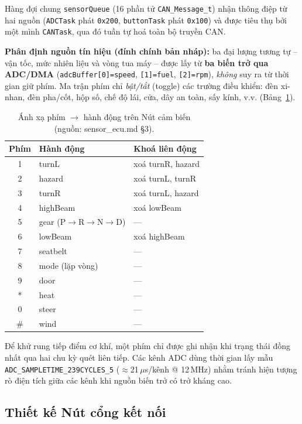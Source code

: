 \documentclass[../DoAn.tex]{subfiles}
\begin{document}
Hàng đợi chung \texttt{sensorQueue} (16 phần tử \texttt{CAN\_Message\_t}) nhận
thông điệp từ hai nguồn (\texttt{ADCTask} phát \texttt{0x200},
\texttt{buttonTask} phát \texttt{0x100}) và được tiêu thụ bởi một mình
\texttt{CANTask}, qua đó tuần tự hoá toàn bộ truyền CAN.

\medskip
\noindent\textbf{Phân định nguồn tín hiệu (đính chính bản nháp):} ba đại lượng
tương tự -- vận tốc, mức nhiên liệu và vòng tua máy -- được lấy từ \textbf{ba
biến trở qua ADC/DMA} (\texttt{adcBuffer[0]=speed}, \texttt{[1]=fuel},
\texttt{[2]=rpm}), \emph{không} suy ra từ thời gian giữ phím. Ma trận phím chỉ
\emph{bật/tắt} (toggle) các trường điều khiển: đèn xi-nhan, đèn pha/cốt, hộp số,
chế độ lái, cửa, dây an toàn, sấy kính, v.v. (Bảng~\ref{tab:keypad}).

\begin{table}[H]
  \centering
  \caption{Ánh xạ phím $\to$ hành động trên Nút cảm biến (nguồn: sensor\_ecu.md §3).}
  \label{tab:keypad}
  \begin{tabular}{@{}cll@{}}
    \toprule
    \textbf{Phím} & \textbf{Hành động} & \textbf{Khoá liên động} \\
    \midrule
    1 & turnL & xoá turnR, hazard \\
    2 & hazard & xoá turnL, turnR \\
    3 & turnR & xoá turnL, hazard \\
    4 & highBeam & xoá lowBeam \\
    5 & gear (P$\to$R$\to$N$\to$D) & --- \\
    6 & lowBeam & xoá highBeam \\
    7 & seatbelt & --- \\
    8 & mode (lặp vòng) & --- \\
    9 & door & --- \\
    * & heat & --- \\
    0 & steer & --- \\
    \# & wind & --- \\
    \bottomrule
  \end{tabular}
\end{table}

Để khử rung tiếp điểm cơ khí, một phím chỉ được ghi nhận khi trạng thái đồng
nhất qua hai chu kỳ quét liên tiếp. Các kênh ADC dùng thời gian lấy mẫu
\texttt{ADC\_SAMPLETIME\_239CYCLES\_5} ($\approx$21\,$\mu$s/kênh @ 12\,MHz) nhằm
tránh hiện tượng rò điện tích giữa các kênh khi nguồn biến trở có trở kháng cao.

\subsection{Thiết kế Nút cổng kết nối}
\label{section:4.2.2}
\end{document}
